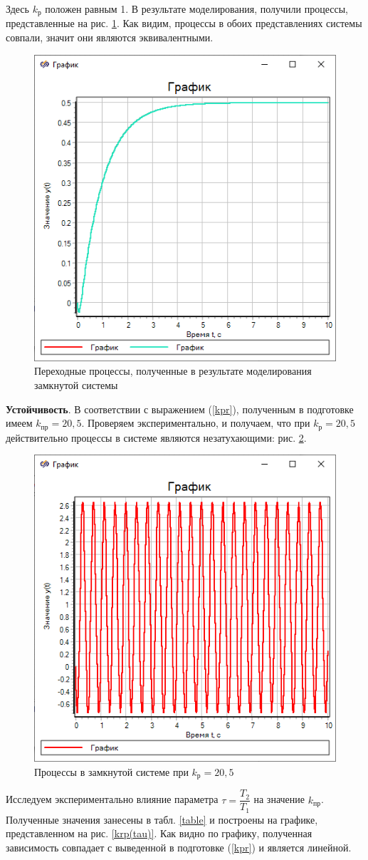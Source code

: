	Здесь $k_\text{р}$ положен равным 1. В результате моделирования, получили процессы, представленные на рис. \ref{graph2}. Как видим, процессы в обоих представлениях системы совпали, значит они являются эквивалентными.
	
	\begin{figure}[h]
		\centering\includegraphics[width=.45\textwidth]{png/graph2.png}
		\caption{Переходные процессы, полученные в результате моделирования замкнутой системы}
		\label{graph2}
	\end{figure}

	\textbf{Устойчивость}. В соответствии с выражением (\ref{kpr}), полученным в подготовке имеем $k_\text{пр} = 20,5$. Проверяем экспериментально, и получаем, что при $k_\text{р} = 20,5$ действительно процессы в системе являются незатухающими: рис. \ref{graph4}.
	
	\begin{figure}[h]
		\centering\includegraphics[width=.45\textwidth]{png/graph4.png}
		\caption{Процессы в замкнутой системе при $k_\text{р} = 20,5$}
		\label{graph4}
	\end{figure}

	Исследуем экспериментально влияние параметра $\tau = \dfrac{T_2}{T_1}$ на значение $k_\text{пр}$. Полученные значения занесены в табл. \ref{table} и построены на графике, представленном на рис. \ref{krp(tau)}. Как видно по графику, полученная зависимость совпадает с выведенной в подготовке (\ref{kpr}) и является линейной.

